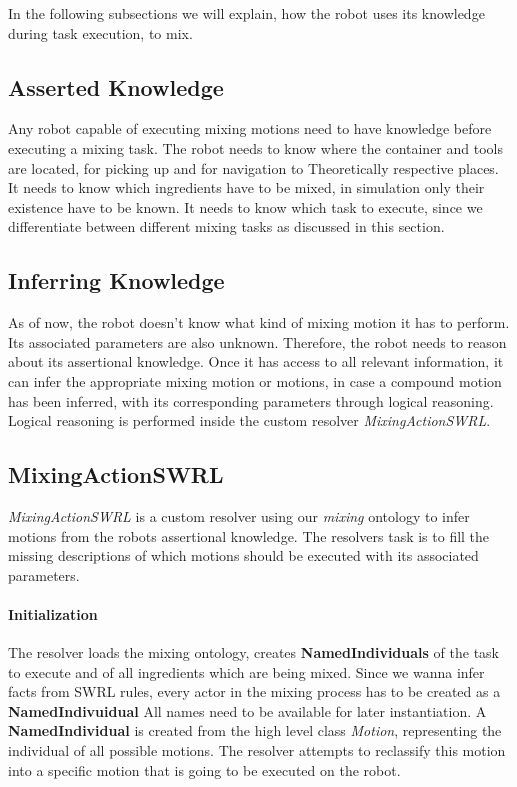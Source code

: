 In the following subsections we will explain, how the robot uses its knowledge during task execution, 
to mix. 

\subsection{Asserted Knowledge}
Any robot capable of executing mixing motions need to have knowledge before executing a mixing task. 
The robot needs to know where the container and tools are located, for picking up and for navigation to Theoretically
respective places. It needs to know which ingredients have to be mixed, in simulation only their existence have to be known. 
It needs to know which task to execute, since we differentiate between different mixing tasks as discussed in this section. 


\subsection{Inferring Knowledge}
As of now, the robot doesn't know what kind of mixing motion it has to perform. Its associated parameters are also unknown. 
Therefore, the robot needs to reason about its assertional knowledge.
Once it has access to all relevant information, it can infer the appropriate mixing motion or motions, in case a compound motion has been
inferred, with its corresponding parameters through logical reasoning.
Logical reasoning is performed inside the custom resolver \textit{MixingActionSWRL}.

\subsection{MixingActionSWRL}
\label{subsection:MixingActionSWRL}
\textit{MixingActionSWRL} is a custom resolver using our \textit{mixing} ontology to infer motions from the robots assertional knowledge.
The resolvers task is to fill the missing descriptions of which motions should be executed with its associated parameters.

\paragraph{Initialization}
The resolver loads the mixing ontology, creates \textbf{NamedIndividuals} of the task to execute and of all ingredients which are being mixed.
Since we wanna infer facts from SWRL rules, every actor in the mixing process has to be created as a \textbf{NamedIndivuidual} 
All names need to be available for later instantiation.
A \textbf{NamedIndividual} is created from the high level class \textit{Motion}, representing the individual of all possible motions. 
The resolver attempts to reclassify this motion into a specific motion that is going to be executed on the robot.

